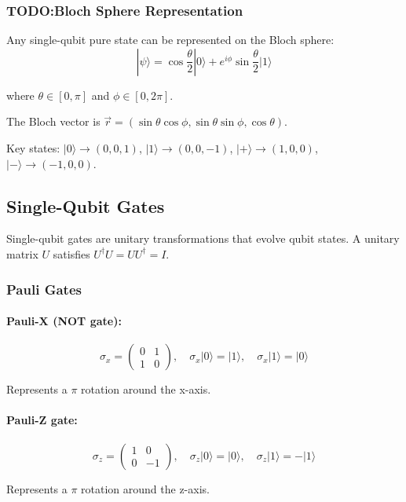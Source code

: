 \documentclass{article}
\begin{document}
\subsubsection*{TODO:Bloch Sphere Representation}

Any single-qubit pure state can be represented on the Bloch sphere:
$$|\psi\rangle = \cos\frac{\theta}{2}|0\rangle + e^{i\phi}\sin\frac{\theta}{2}|1\rangle$$

where $\theta \in [0, \pi]$ and $\phi \in [0, 2\pi]$.

The Bloch vector is $\vec{r} = (\sin\theta\cos\phi, \sin\theta\sin\phi, \cos\theta)$.

Key states: $|0\rangle \to (0,0,1)$, $|1\rangle \to (0,0,-1)$, $|+\rangle \to (1,0,0)$, $|-\rangle \to (-1,0,0)$.

\subsection{Single-Qubit Gates}

Single-qubit gates are unitary transformations that evolve qubit states. A unitary matrix $U$ satisfies $U^\dagger U = UU^\dagger = I$.

\subsubsection*{Pauli Gates}

\paragraph{Pauli-X (NOT gate):}
$$\sigma_x = \begin{pmatrix} 0 & 1 \\ 1 & 0 \end{pmatrix}, \quad \sigma_x|0\rangle = |1\rangle, \quad \sigma_x|1\rangle = |0\rangle$$

Represents a $\pi$ rotation around the x-axis.

\paragraph{Pauli-Z gate:}
$$\sigma_z = \begin{pmatrix} 1 & 0 \\ 0 & -1 \end{pmatrix}, \quad \sigma_z|0\rangle = |0\rangle, \quad \sigma_z|1\rangle = -|1\rangle$$

Represents a $\pi$ rotation around the z-axis.
\end{document}
